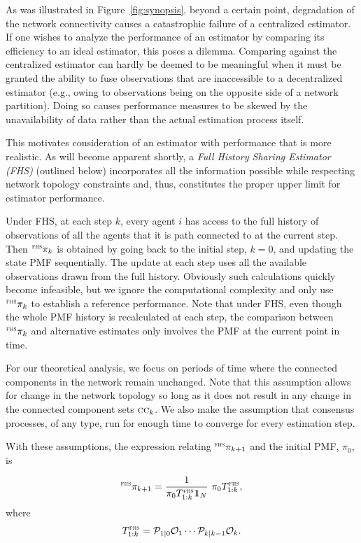\documentclass[journal]{IEEEtran}
\theoremstyle{remark}
\newcommand{\suf}[1]{\textsc{\tiny #1}}  %
\theoremstyle{definition}
\begin{document}
As was illustrated in Figure~\ref{fig:synopsis}, beyond a certain point,
degradation of the network connectivity causes a catastrophic failure of a
centralized estimator.  If one wishes to analyze the performance of an
estimator by comparing its efficiency to an ideal estimator, this poses a
dilemma.  Comparing against the
centralized estimator can hardly be deemed to be meaningful when it
must be granted the ability to fuse observations that
are inaccessible to a decentralized estimator (e.g., owing to observations
being on the opposite side of a network partition). Doing so causes
performance measures to be skewed by the unavailability of data rather than the 
actual estimation process itself.

This motivates consideration of an estimator with performance that is more
realistic.  As will become apparent shortly, a \emph{Full History Sharing Estimator (FHS)} (outlined below) incorporates all the information possible while respecting
network topology constraints and, thus, constitutes the proper upper limit for
estimator performance.

Under FHS, at each step $k$, every agent $i$ has access to the full history of
observations of all the agents that it is path connected to at the current
step.  Then ${}^{\suf{FHS}}{\pi}_{k}$ is obtained by going back to the initial
step, $k=0$, and updating the state PMF sequentially.  The update at each step
uses all the available observations drawn from the full history. Obviously
such calculations quickly become infeasible, but we ignore the computational
complexity and only use ${}^{\suf{FHS}}{\pi}_{k}$ to establish a reference
performance.  Note that under FHS, even though the whole PMF history is
recalculated at each step, the comparison between ${}^{\suf{FHS}}{\pi}_{k}$ and
alternative estimates only involves the PMF at the current point in time.

For our theoretical analysis, we focus on periods of time where the connected
components in the network remain unchanged. Note that this assumption allows
for change in the network topology so long as it does not result in any change in the
connected component sets $\textsc{cc}_k$. We also make the assumption that
consensus processes, of any type, run for enough time to converge for every
estimation step.

With these assumptions, the expression relating ${}^{\suf{FHS}}{\pi}_{k+1}$ and
the initial PMF, ${\pi}_{0}$, is 

\begin{equation}
{}^{\suf{FHS}}{\pi}_{k+1} = \frac{1}{{\pi}_{0}T_{1:k}^{\suf{FHS}}\mathbf{1}_N}\,\,{\pi_{0}}T_{1:k}^{\suf{FHS}},\label{FHS-UPDATE}
\end{equation}
where  
\begin{equation}\label{TFHS}
{T}_{1:k}^{\suf{FHS}}=\mathcal{P}_{1\vert0}\mathcal{O}_{1}\cdots\mathcal{P}_{k\vert k-1}\mathcal{O}_{k}.
\end{equation}
\end{document}
